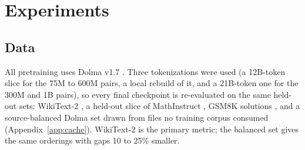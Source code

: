 \documentclass[11pt]{article}
\newcommand{\dagf}{DAGFormer}
\newcommand{\valpha}{\boldsymbol{\alpha}}
\begin{document}
%
%

\section{Experiments}
\label{sec:experiments}

\subsection{Data}
\label{sec:data}

All pretraining uses Dolma v1.7 \citep{soldaini2024dolma}. Three tokenizations were used (a 12B-token slice for the 75M to 600M pairs, a local rebuild of it, and a 21B-token one for the 300M and 1B pairs), so every final checkpoint is re-evaluated on the same held-out sets: WikiText-2 \citep{merity2016wikitext}, a held-out slice of MathInstruct \citep{yue2023mammoth}, GSM8K solutions \citep{cobbe2021gsm8k}, and a source-balanced Dolma set drawn from files no training corpus consumed (Appendix~\ref{app:cache}). WikiText-2 is the primary metric; the balanced set gives the same orderings with gaps 10 to 25\% smaller.
\end{document}
